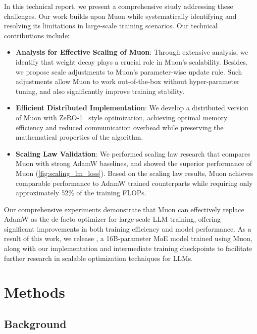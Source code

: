 In this technical report, we present a comprehensive study addressing these challenges. Our work builds upon Muon while systematically identifying and resolving its limitations in large-scale training scenarios. Our technical contributions include:

\begin{itemize}
    \item \textbf{Analysis for Effective Scaling of Muon}: Through extensive analysis, we identify that weight decay plays a crucial role in Muon's scalability. Besides, we propose scale adjustments to Muon's parameter-wise update rule. Such adjustments allow Muon to work out-of-the-box without hyper-parameter tuning, and also significantly improve training stability.
    
    \item \textbf{Efficient Distributed Implementation}: We develop a distributed version of Muon with ZeRO-1~\citep{Rajbhandari_2020} style optimization, achieving optimal memory efficiency and reduced communication overhead while preserving the mathematical properties of the algorithm.
    
    \item \textbf{Scaling Law Validation}: We performed scaling law research that compares Muon with strong AdamW baselines, and showed the superior performance of Muon (\ref{fig:scaling_lm_loss}). Based on the scaling law results, Muon achieves comparable performance to AdamW trained counterparts while requiring only approximately 52\% of the training FLOPs.
    
    
\end{itemize}


Our comprehensive experiments demonstrate that Muon can effectively replace AdamW as the de facto optimizer for large-scale LLM training, offering significant improvements in both training efficiency and model performance. As a result of this work, we release \ours, a 16B-parameter MoE model trained using Muon, along with our implementation and intermediate training checkpoints to facilitate further research in scalable optimization techniques for LLMs. 

\section{Methods}

\subsection{Background}

